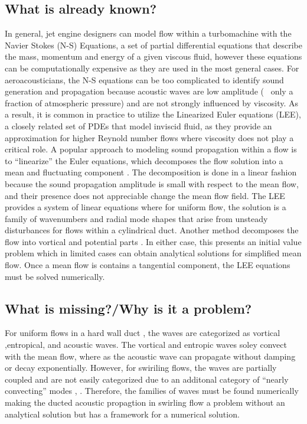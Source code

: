 \subsection{What is already known?}

In general, jet engine designers can model flow within a turbomachine with 
the Navier Stokes (N-S) Equations, a set of partial differential equations that
describe the mass, momentum and energy of a given viscous fluid, however 
these equations can be computationally expensive as they are used in the most
general cases. For aeroacousticians, the N-S equations can be too complicated
to identify sound generation and propagation because acoustic waves are low 
amplitude (~ only a fraction of atmospheric pressure) and are not strongly
influenced by viscosity.   As a result, it is common in practice to 
utilize the Linearized Euler equations (LEE),
a closely related set of PDEs that model inviscid fluid, as they provide an 
approximation for higher Reynold number flows where viscosity 
does not play a critical role. A popular approach to modeling sound propagation 
within a flow is to ``linearize'' the Euler equations, which decomposes the 
flow solution into a mean and fluctuating component . The decomposition is done 
in a linear fashion because the sound propagation amplitude is small with respect
to the mean flow, and their presence does not appreciable change the mean flow 
field. The LEE provides a system of linear equations where for uniform flow, 
the solution is a family of wavenumbers and radial mode shapes that arise from 
unsteady disturbances for flows within a cylindrical duct.  Another method 
decomposes the flow into vortical and potential parts \cite{golubev1996sound}.
In either case, this presents an initial value problem which 
in limited cases can obtain analytical solutions for simplified mean flow. Once a mean flow 
is contains a tangential component, the LEE equations must be solved numerically.  
\subsection{What is missing?/Why is it a problem?}
For uniform flows in a hard wall duct , the waves are categorized as vortical 
,entropical, and acoustic waves. The vortical and entropic waves soley convect with 
the mean flow, where as the acoustic wave can propagate without damping or decay 
exponentially.  However, for swiriling flows, the waves are partially coupled
and are not easily categorized due to an additonal category of ``nearly convecting'' 
modes \cite{Kerrebrock2012},\cite{KERREBROCK1974} . 
Therefore, the families of waves must be found numerically \cite{Envia2004}
making the ducted acoustic propagtion in swirling flow a problem without
an analytical solution but has a framework for a numerical solution.
